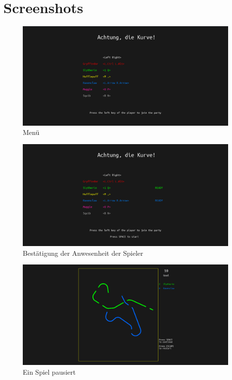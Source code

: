 \documentclass[doktyp=studarbeit]{TUBAFarbeiten}
\begin{document}
\section{Screenshots}
\begin{figure}[!htb]
	\centering
	\includegraphics[width=0.79\linewidth]{2.png}
	\caption{Menü}
	\label{fig:menu}
\end{figure}

\begin{figure}[!htb]
	\centering
	\includegraphics[width=0.79\linewidth]{1.png}
    \caption{Bestätigung der Anwesenheit der Spieler}
	\label{fig:confirmation}
\end{figure}

\begin{figure}[!htb]
	\centering
	\includegraphics[width=0.79\linewidth]{3.png}
	\caption{Ein Spiel pausiert}
	\label{fig:pause}
\end{figure}
\end{document}
